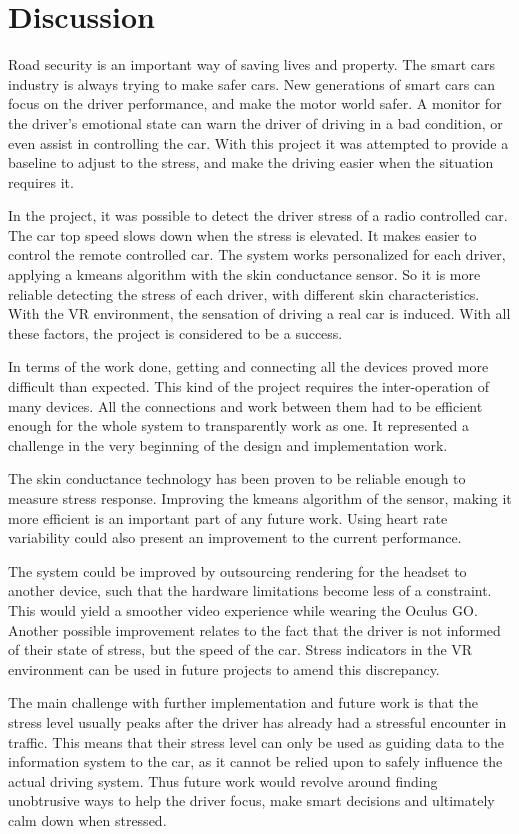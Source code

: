 \section{Discussion}\label{sec:discussion}

Road security is an important way of saving lives and property. The smart
cars industry is always trying to make safer cars. New generations of smart
cars can focus on the driver performance, and make the motor world safer. A
monitor for the driver's emotional state can warn the driver of driving in
a bad condition, or even assist in controlling the car. With this project
it was attempted to provide a baseline to adjust to the stress, and make
the driving easier when the situation requires it.

In the project, it was possible to detect the driver stress of a
radio controlled car. The car top speed slows down when the stress is
elevated. It makes easier to control the remote controlled car. The system
works personalized for each driver, applying a k\-means algorithm with the
skin conductance sensor. So it is more reliable detecting the stress of
each driver, with different skin characteristics. With the VR environment,
the sensation of driving a real car is induced. With all these factors,
the project is considered to be a success. 

In terms of the work done, getting and connecting all the devices proved more
difficult than expected. This kind of the project requires the inter-operation
of many devices. All the connections and work between them had to be efficient
enough for the whole system to transparently work as one. It represented
a challenge in the very beginning of the design and implementation work.

The skin conductance technology has been proven to be reliable enough to
measure stress response. Improving the k\-means algorithm of the sensor,
making it more efficient is an important part of any future work. Using heart
rate variability could also present an improvement to the current performance.

The system could be improved by outsourcing rendering for the headset
to another device, such that the hardware limitations become less of a
constraint. This would yield a smoother video experience while wearing the
Oculus GO\@. Another possible improvement relates to the fact that the driver
is not informed of their state of stress, but the speed of the car. Stress
indicators in the VR environment can be used in future projects to amend
this discrepancy.

The main challenge with further implementation and future work is that the
stress level usually peaks after the driver has already had a stressful
encounter in traffic. This means that their stress level can only be used as
guiding data to the information system to the car, as it cannot be relied
upon to safely influence the actual driving system. Thus future work would
revolve around finding unobtrusive ways to help the driver focus, make smart
decisions and ultimately calm down when stressed.
